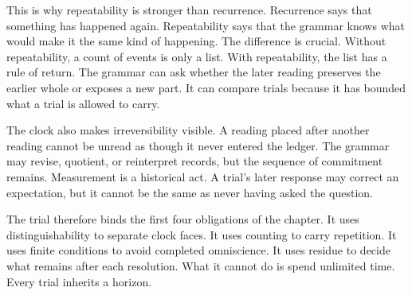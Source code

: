 This is why repeatability is stronger than recurrence. Recurrence says
that something has happened again. Repeatability says that the grammar
knows what would make it the same kind of happening. The difference is
crucial. Without repeatability, a count of events is only a list. With
repeatability, the list has a rule of return. The grammar can ask
whether the later reading preserves the earlier whole or exposes a new
part. It can compare trials because it has bounded what a trial is
allowed to carry.

The clock also makes irreversibility visible. A reading placed after
another reading cannot be unread as though it never entered the ledger.
The grammar may revise, quotient, or reinterpret records, but the
sequence of commitment remains. Measurement is a historical act. A
trial's later response may correct an expectation, but it cannot be the
same as never having asked the question.

The trial therefore binds the first four obligations of the chapter. It
uses distinguishability to separate clock faces. It uses counting to
carry repetition. It uses finite conditions to avoid completed
omniscience. It uses residue to decide what remains after each
resolution. What it cannot do is spend unlimited time. Every trial
inherits a horizon.
